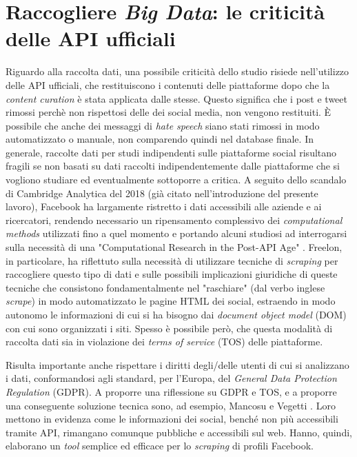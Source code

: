\section{Raccogliere \textit{Big Data}: le criticità delle API ufficiali}
Riguardo alla raccolta dati, una possibile criticità dello studio risiede nell'utilizzo delle API ufficiali, che restituiscono i contenuti delle piattaforme dopo che la \textit{content curation} è stata applicata dalle stesse. Questo significa che i post e tweet rimossi perchè non rispettosi delle  dei social media, non vengono restituiti. È possibile che anche dei messaggi di \textit{hate speech} siano stati rimossi in modo automatizzato o manuale, non comparendo quindi nel database finale.
In generale, raccolte dati per studi indipendenti sulle piattaforme social risultano fragili se non basati su dati raccolti indipendentemente dalle piattaforme che si vogliono studiare ed eventualmente sottoporre a critica.
A seguito dello scandalo di Cambridge Analytica del 2018 (già citato nell'introduzione del presente lavoro), Facebook ha largamente ristretto i dati accessibili alle aziende e ai ricercatori, rendendo necessario un ripensamento complessivo dei \textit{computational methods} utilizzati fino a quel momento e portando alcuni studiosi ad interrogarsi sulla necessità di una "Computational Research in the Post-API Age" \citep{freelon2018}. Freelon, in particolare, ha riflettuto sulla necessità di utilizzare tecniche di \textit{scraping} per raccogliere questo tipo di dati e sulle possibili implicazioni giuridiche di queste tecniche che consistono fondamentalmente nel "raschiare" (dal verbo inglese \textit{scrape}) in modo automatizzato le pagine HTML dei social, estraendo in modo autonomo le informazioni di cui si ha bisogno dai \textit{document object model} (DOM) con cui sono organizzati i siti. Spesso è possibile però, che questa modalità di raccolta dati sia in violazione dei \textit{terms of service} (TOS) delle piattaforme.

Risulta importante anche rispettare i diritti degli/delle utenti di cui si analizzano i dati, conformandosi agli standard, per l'Europa, del \textit{General Data Protection Regulation} (GDPR). A proporre una riflessione su GDPR e TOS, e a proporre una conseguente soluzione tecnica sono, ad esempio, Mancosu e Vegetti \citep{mancosu2020}. Loro mettono in evidenza come le informazioni dei social, benché non più accessibili tramite API, rimangano comunque pubbliche e accessibili sul web. Hanno, quindi, elaborano un \textit{tool} semplice ed efficace per lo \textit{scraping} di profili Facebook.

